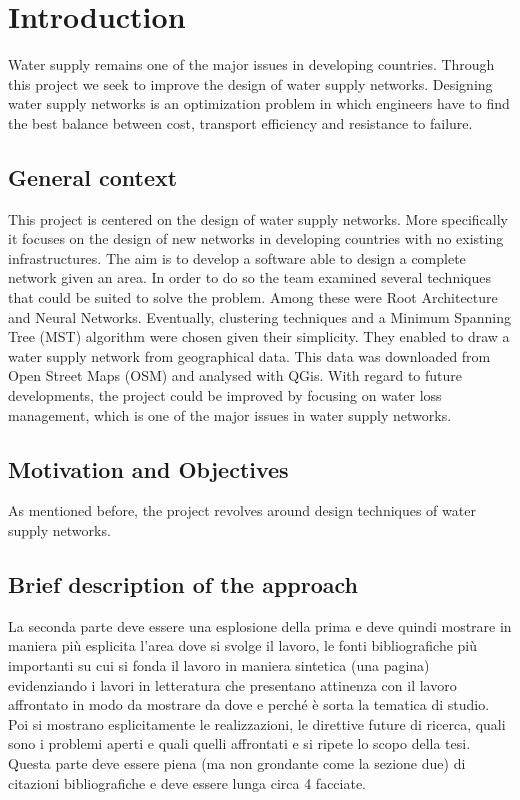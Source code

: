 \chapter{Introduction}
\label{Introduzione}
\thispagestyle{empty}




\parindent
Water supply remains one of the major issues in developing countries. Through this
project we seek to improve the design of water supply networks. Designing water supply
networks is an optimization problem in which engineers have to find the best balance
between cost, transport efficiency and resistance to failure.

\section{General context}
This project is centered on the design of water supply networks. More specifically it focuses on the design of new 
networks in developing countries with no existing infrastructures.
The aim is to develop a software able to design a complete network given an area.
In order to do so the team examined several techniques that could be suited to solve the problem.
Among these were Root Architecture and Neural Networks. Eventually, clustering techniques and a Minimum
Spanning Tree (MST) algorithm were chosen given their simplicity. They enabled to draw a water supply network 
from geographical data. This data was downloaded from Open Street Maps (OSM) and analysed with QGis.
With regard to future developments, the project could be improved by focusing on water loss management,
which is one of the major issues in water supply networks.

\section{Motivation and Objectives}
As mentioned before, the project revolves around design techniques of water supply networks. 


\section{Brief description of the approach}
La seconda parte deve essere una esplosione della prima e deve quindi mostrare in maniera pi\`u esplicita l'area dove si svolge il lavoro, le fonti bibliografiche pi\`u importanti su cui si fonda il lavoro in maniera sintetica (una pagina) evidenziando i lavori in letteratura che presentano attinenza con il lavoro affrontato in modo da mostrare da dove e perch\'e \`e sorta la tematica di studio. Poi si mostrano esplicitamente le realizzazioni, le direttive future di ricerca, quali sono i problemi aperti e quali quelli affrontati e si ripete lo scopo della tesi. Questa parte deve essere piena (ma non grondante come la sezione due) di citazioni bibliografiche e deve essere lunga circa 4 facciate.




